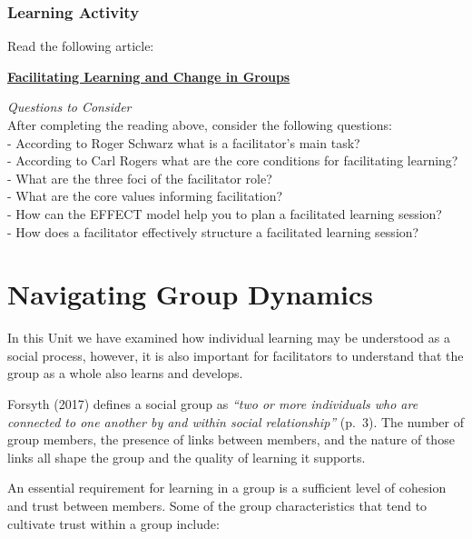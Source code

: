 \documentclass[
]{book}
\begin{document}
\begin{reflect}
\hypertarget{learning-activity-4}{%
\subsubsection*{Learning Activity}\label{learning-activity-4}}

Read the following article:

\href{https://infed.org/mobi/facilitating-learning-and-change-in-groups-and-group-sessions/}{\textbf{Facilitating Learning and Change in Groups}}

\emph{Questions to Consider}\\
After completing the reading above, consider the following questions:\\
- According to Roger Schwarz what is a facilitator's main task?\\
- According to Carl Rogers what are the core conditions for facilitating learning?\\
- What are the three foci of the facilitator role?\\
- What are the core values informing facilitation?\\
- How can the EFFECT model help you to plan a facilitated learning session?\\
- How does a facilitator effectively structure a facilitated learning session?
\end{reflect}

\hypertarget{navigating-group-dynamics}{%
\section{Navigating Group Dynamics}\label{navigating-group-dynamics}}

In this Unit we have examined how individual learning may be understood as a social process, however, it is also important for facilitators to understand that the group as a whole also learns and develops.

Forsyth (2017) defines a social group as \emph{``two or more individuals who are connected to one another by and within social relationship''} (p.~3). The number of group members, the presence of links between members, and the nature of those links all shape the group and the quality of learning it supports.

An essential requirement for learning in a group is a sufficient level of cohesion and trust between members. Some of the group characteristics that tend to cultivate trust within a group include:
\end{document}
